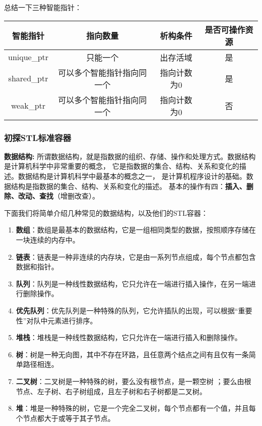 总结一下三种智能指针：
\begin{center}

    \begin{tabular}{cccc}
        \hline
        智能指针 & 指向数量 & 析构条件 & 是否可操作资源\\
        \hline
        unique\_ptr & 只能一个 & 出存活域 & 是\\
        shared\_ptr & 可以多个智能指针指向同一个 & 指向计数为0 & 是\\
        weak\_ptr & 可以多个智能指针指向同一个 & 指向计数为0 & 否\\
        \hline
        
    \end{tabular}
\end{center}

\subsubsection{初探STL标准容器}
\textbf{数据结构:}
所谓数据结构，就是指数据的组织、存储、操作和处理方式。数据结构是计算机科学中非常重要的概念，
它是指数据的集合、结构、关系和变化的描述。数据结构是计算机科学中最基本的概念之一，
是计算机程序设计的基础。数据结构是指数据的集合、结构、关系和变化的描述。
基本的操作有四：\textbf{插入、删除、改动、查找}（增删改查）。


下面我们将简单介绍几种常见的数据结构，以及他们的STL容器：

\begin{enumerate}
    \item \textbf{数组}：数组是最基本的数据结构，它是一组相同类型的数据，按照顺序存储在一块连续的内存中。
    \item \textbf{链表}：链表是一种非连续的内存块，它是由一系列节点组成，每个节点都包含数据和指针。
    \item \textbf{队列}：队列是一种线性数据结构，它只允许在一端进行插入操作，在另一端进行删除操作。
    \item \textbf{优先队列}：优先队列是一种特殊的队列，它允许插队的出现，可以根据“重要性”对队中元素进行排序。
    \item \textbf{堆栈}：堆栈是一种线性数据结构，它只允许在一端进行插入和删除操作。
    \item \textbf{树}：树是一种无向图，其中不存在环路，且任意两个结点之间有且仅有一条简单路径相连。
    \item \textbf{二叉树}：二叉树是一种特殊的树，要么没有根节点，是一颗空树
    ；要么由根节点、左子树、右子树组成，且左子树和右子树都是二叉树。
    \item \textbf{堆}：堆是一种特殊的树，它是一个完全二叉树，每个节点都有一个值，并且每个节点都大于或等于其子节点。
\end{enumerate}

